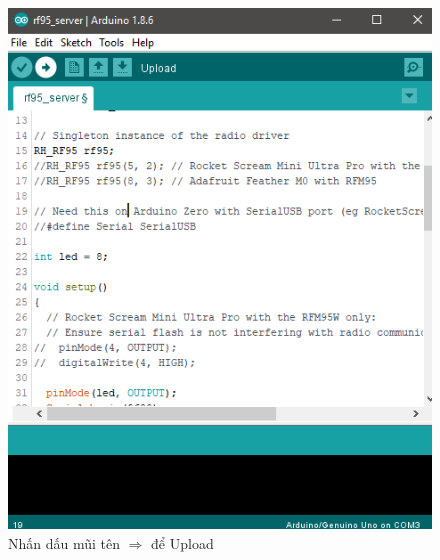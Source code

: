 \begin{enumerate}
\begin{center}
\begin{figure}[htp]
\begin{center}
\includegraphics[scale=0.8]{image4/arduino17.png}
\end{center}
\caption{Nhấn dấu mũi tên \textbf{$\Rightarrow$} để Upload}
\end{figure}
\end{center}
\end{enumerate}
